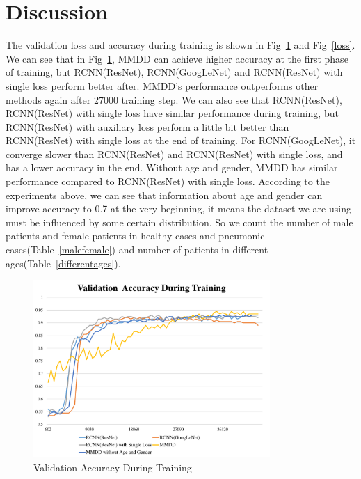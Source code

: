 \documentclass[journal]{IEEEtran}
\begin{document}
\section{Discussion}
\label{discuss}
The validation loss and accuracy during training is shown in Fig~\ref{aac} and Fig~\ref{loss}. We can see that in Fig~\ref{aac}, MMDD can achieve higher accuracy at the first phase of training, but RCNN(ResNet), RCNN(GoogLeNet) and RCNN(ResNet) with single loss perform better after. MMDD's performance outperforms other methods again after 27000 training step. We can also see that RCNN(ResNet), RCNN(ResNet) with single loss have similar performance during training, but RCNN(ResNet) with auxiliary loss perform a little bit better than RCNN(ResNet) with single loss at the end of training. For RCNN(GoogLeNet), it converge slower than RCNN(ResNet) and RCNN(ResNet) with single loss, and has a lower accuracy in the end. Without age and gender, MMDD has similar performance compared to RCNN(ResNet) with single loss. According to the experiments above, we can see that information about age and gender can improve accuracy to 0.7 at the very beginning, it means the dataset we are using must be influenced by some certain distribution. So we count the number of male patients and female patients in healthy cases and pneumonic cases(Table~\ref{malefemale}) and number of patients in different ages(Table~\ref{differentages}). 

\begin{figure}[t]
    \centerline{\includegraphics[width=90mm]{aac.pdf}}
    \vspace{-0cm}
    \caption{Validation Accuracy During Training}
    \vspace{-0cm}
    \label{aac}
    \end{figure}
\end{document}
